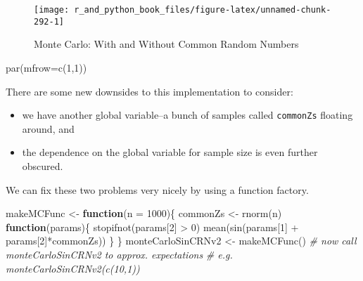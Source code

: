 \documentclass[
  12pt,
  krantz2]{krantz}
\makeatletter
\newenvironment{Shaded}{\begin{snugshade}}{\end{snugshade}}
\newcommand{\AttributeTok}[1]{\textcolor[rgb]{0.61,0.61,0.61}{#1}}
\newcommand{\CommentTok}[1]{\textcolor[rgb]{0.37,0.37,0.37}{\textit{#1}}}
\newcommand{\ControlFlowTok}[1]{\textcolor[rgb]{0.27,0.27,0.27}{\textbf{#1}}}
\newcommand{\DecValTok}[1]{\textcolor[rgb]{0.06,0.06,0.06}{#1}}
\newcommand{\FunctionTok}[1]{\textcolor[rgb]{0,0,0}{#1}}
\newcommand{\NormalTok}[1]{#1}
\newcommand{\OtherTok}[1]{\textcolor[rgb]{0.37,0.37,0.37}{#1}}
\newcommand{\SpecialCharTok}[1]{\textcolor[rgb]{0,0,0}{#1}}
\providecommand{\tightlist}{%
  \setlength{\itemsep}{0pt}\setlength{\parskip}{0pt}}
\newenvironment{kframe}{%
\medskip{}
\setlength{\fboxsep}{.8em}
 \def\at@end@of@kframe{}%
 \ifinner\ifhmode%
  \def\at@end@of@kframe{\end{minipage}}%
  \begin{minipage}{\columnwidth}%
 \fi\fi%
 \def\FrameCommand##1{\hskip\@totalleftmargin \hskip-\fboxsep
 \colorbox{shadecolor}{##1}\hskip-\fboxsep
     \hskip-\linewidth \hskip-\@totalleftmargin \hskip\columnwidth}%
 \MakeFramed {\advance\hsize-\width
   \@totalleftmargin\z@ \linewidth\hsize
   \@setminipage}}%
 {\par\unskip\endMakeFramed%
 \at@end@of@kframe}
\renewenvironment{Shaded}{\begin{kframe}}{\end{kframe}}
\makeatother
\begin{document}
\begin{figure}

{\centering \texttt{[image: r\_and\_python\_book\_files/figure-latex/unnamed-chunk-292-1]} 

}

\caption{Monte Carlo: With and Without Common Random Numbers}\label{fig:unnamed-chunk-292}
\end{figure}

\begin{Shaded}
\begin{Highlighting}[]
\FunctionTok{par}\NormalTok{(}\AttributeTok{mfrow=}\FunctionTok{c}\NormalTok{(}\DecValTok{1}\NormalTok{,}\DecValTok{1}\NormalTok{))}
\end{Highlighting}
\end{Shaded}

There are some new downsides to this implementation to consider:

\begin{itemize}
\tightlist
\item
  we have another global variable--a bunch of samples called \texttt{commonZs} floating around, and
\item
  the dependence on the global variable for sample size is even further obscured.
\end{itemize}

We can fix these two problems very nicely by using a function factory.

\begin{Shaded}
\begin{Highlighting}[]
\NormalTok{makeMCFunc }\OtherTok{\textless{}{-}} \ControlFlowTok{function}\NormalTok{(}\AttributeTok{n =} \DecValTok{1000}\NormalTok{)\{}
\NormalTok{  commonZs }\OtherTok{\textless{}{-}} \FunctionTok{rnorm}\NormalTok{(n)}
  \ControlFlowTok{function}\NormalTok{(params)\{}
    \FunctionTok{stopifnot}\NormalTok{(params[}\DecValTok{2}\NormalTok{] }\SpecialCharTok{\textgreater{}} \DecValTok{0}\NormalTok{) }
    \FunctionTok{mean}\NormalTok{(}\FunctionTok{sin}\NormalTok{(params[}\DecValTok{1}\NormalTok{] }\SpecialCharTok{+}\NormalTok{ params[}\DecValTok{2}\NormalTok{]}\SpecialCharTok{*}\NormalTok{commonZs))    }
\NormalTok{  \}  }
\NormalTok{\}}
\NormalTok{monteCarloSinCRNv2 }\OtherTok{\textless{}{-}} \FunctionTok{makeMCFunc}\NormalTok{()}
\CommentTok{\# now call monteCarloSinCRNv2 to approx. expectations}
\CommentTok{\# e.g. monteCarloSinCRNv2(c(10,1))}
\end{Highlighting}
\end{Shaded}
\end{document}

